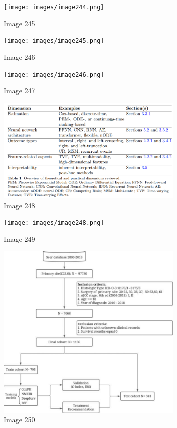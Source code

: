 \documentclass{article}%
\begin{document}
%


\begin{figure}[h!]%
\centering%
\texttt{[image: images/image244.png]}%
\caption{Image 245}%
\end{figure}

%


\begin{figure}[h!]%
\centering%
\texttt{[image: images/image245.png]}%
\caption{Image 246}%
\end{figure}

%


\begin{figure}[h!]%
\centering%
\texttt{[image: images/image246.png]}%
\caption{Image 247}%
\end{figure}

%


\begin{figure}[h!]%
\centering%
\includegraphics[width=0.8\textwidth]{images/image247.png}%
\caption{Image 248}%
\end{figure}

%


\begin{figure}[h!]%
\centering%
\texttt{[image: images/image248.png]}%
\caption{Image 249}%
\end{figure}

%


\begin{figure}[h!]%
\centering%
\includegraphics[width=0.8\textwidth]{images/image249.png}%
\caption{Image 250}%
\end{figure}
\end{document}
